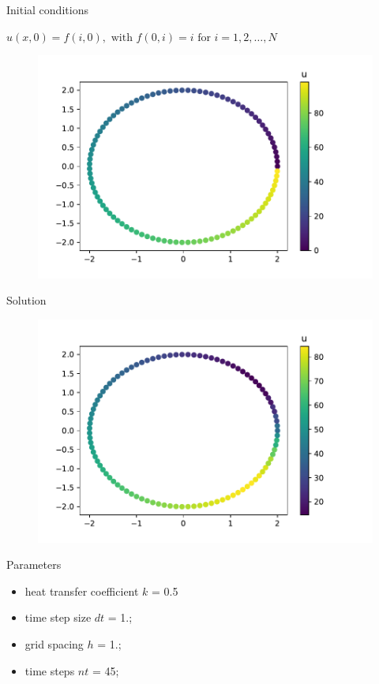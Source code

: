 \documentclass[12pt,t]{beamer}
\begin{document}
\begin{frame}{Initial conditions}

\begin{center}
$u(x,0) = f(i,0), \text{ with } f(0,i)=i \text{ for } i=1,2,\ldots,N$
\end{center}

\begin{figure}
\includegraphics[scale=0.5]{./images/initial_conditons.pdf}
\end{figure}

\end{frame}

\begin{frame}{Solution}
\vspace{-0.5cm}
\begin{figure}
\includegraphics[scale=0.5]{./images/solution.pdf}
\end{figure}
\vspace{-0.5cm}
\begin{block}{Parameters}
\begin{itemize}
\item heat transfer coefficient $k$ = 0.5
\item time step size $dt$ = 1.;
\item grid spacing $h$ = 1.;
\item time steps $nt$ = 45;
\end{itemize}

\end{block}

\end{frame}
\end{document}
